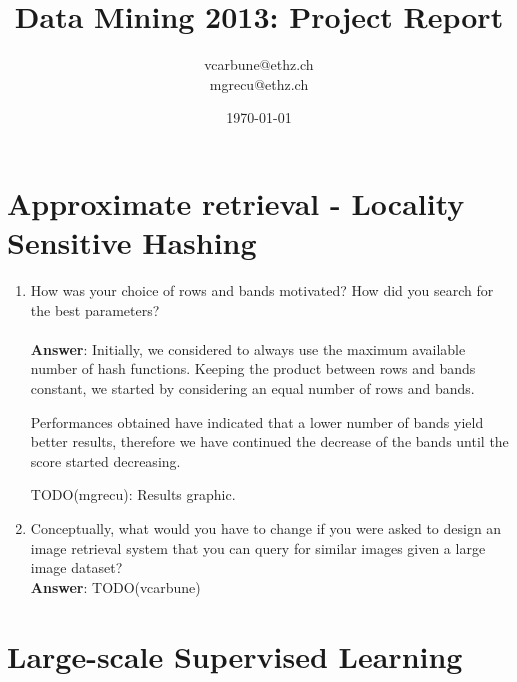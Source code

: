 \documentclass[11pt]{article}
\title{Data Mining 2013: Project Report}
\author{vcarbune@ethz.ch\\ mgrecu@ethz.ch}
\date{\today}
\begin{document}
\maketitle

\section{Approximate retrieval - Locality Sensitive Hashing}
\begin{enumerate}
\item How was your choice of rows and bands motivated? How did you search for the
best parameters? \\ \\

\textbf{Answer}: Initially, we considered to always use the maximum available number of
hash functions. Keeping the product between rows and bands constant, we
started by considering an equal number of rows and bands.

Performances obtained have indicated that a lower number of bands yield
better results, therefore we have continued the decrease of the bands
until the score started decreasing.

TODO(mgrecu): Results graphic.

\item Conceptually, what would you have to change if you were asked to design an image
  retrieval system that you can query for similar images given a large image
  dataset? \\

\textbf{Answer}: TODO(vcarbune)

\end{enumerate}

\section{Large-scale Supervised Learning}
\end{document}
